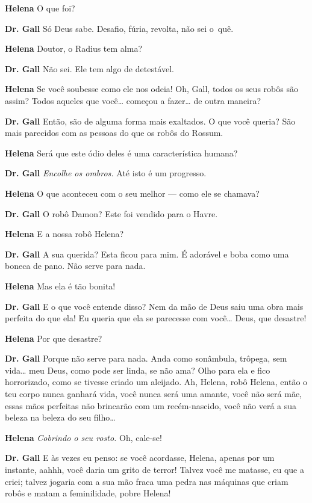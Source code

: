 \textbf{Helena} O que foi?

\textbf{Dr. Gall} Só Deus sabe. Desafio, fúria, revolta, não sei \mbox{o quê}.

\textbf{Helena} Doutor, o Radius tem alma?

\textbf{Dr. Gall} Não sei. Ele tem algo de detestável.

\textbf{Helena} Se você soubesse como ele nos odeia! Oh, Gall, todos os seus robôs são
assim? Todos aqueles que você\ldots{} começou a fazer\ldots{} de outra maneira?

\textbf{Dr. Gall} Então, são de alguma forma mais exaltados. O que você queria? São
mais parecidos com as pessoas do que os robôs do Rossum.

\textbf{Helena} Será que este ódio deles é uma característica humana?

\textbf{Dr. Gall} \emph{Encolhe os ombros.} Até isto é um progresso.

\textbf{Helena} O que aconteceu com o seu melhor --- como ele se chamava?

\textbf{Dr. Gall} O robô Damon? Este foi vendido para o Havre.

\textbf{Helena} E a nossa robô Helena?

\textbf{Dr. Gall} A sua querida? Esta ficou para mim. É adorável e boba como uma boneca de pano. 
Não serve para nada.


\textbf{Helena} Mas ela é tão bonita!

\textbf{Dr. Gall} E o que você entende disso? Nem da mão de Deus saiu uma obra mais
perfeita do que ela! Eu queria que ela se parecesse com você\ldots{} Deus, que desastre!

\textbf{Helena} Por que desastre?

\textbf{Dr. Gall} Porque não serve para nada. Anda como sonâmbula, trôpega, sem vida\ldots{}
meu Deus, como pode ser linda, se não ama? Olho para ela e fico horrorizado,
como se tivesse criado um aleijado. Ah, Helena, robô Helena, então o teu corpo
nunca ganhará vida, você nunca será uma amante, você não será mãe, essas mãos
perfeitas não brincarão com um recém-nascido, você não verá a sua beleza na
beleza do seu filho\ldots{}

\textbf{Helena} \emph{Cobrindo o seu rosto.} Oh, cale-se!

\textbf{Dr. Gall} E às vezes eu penso: se você acordasse, Helena, apenas por um
instante, aahhh, você daria um grito de terror! Talvez você me matasse, eu que
a criei; talvez jogaria com a sua mão fraca uma pedra nas máquinas que criam
robôs e matam a feminilidade, pobre Helena!

